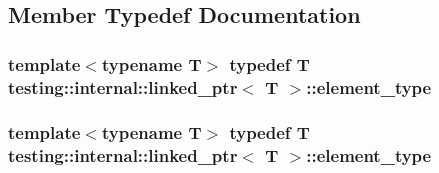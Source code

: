 \subsection{Member Typedef Documentation}
\hypertarget{classtesting_1_1internal_1_1linked__ptr_a295c7d1ee4100d916514c4e4385a0063}{
\subsubsection[{element\-\_\-type}]{\setlength{\rightskip}{0pt plus 5cm}template$<$typename T$>$ typedef T {\bf testing\-::internal\-::linked\-\_\-ptr}$<$ T $>$\-::{\bf element\-\_\-type}}}\label{classtesting_1_1internal_1_1linked__ptr_a295c7d1ee4100d916514c4e4385a0063}
\hypertarget{classtesting_1_1internal_1_1linked__ptr_a295c7d1ee4100d916514c4e4385a0063}{
\subsubsection[{element\-\_\-type}]{\setlength{\rightskip}{0pt plus 5cm}template$<$typename T$>$ typedef T {\bf testing\-::internal\-::linked\-\_\-ptr}$<$ T $>$\-::{\bf element\-\_\-type}}}\label{classtesting_1_1internal_1_1linked__ptr_a295c7d1ee4100d916514c4e4385a0063}


